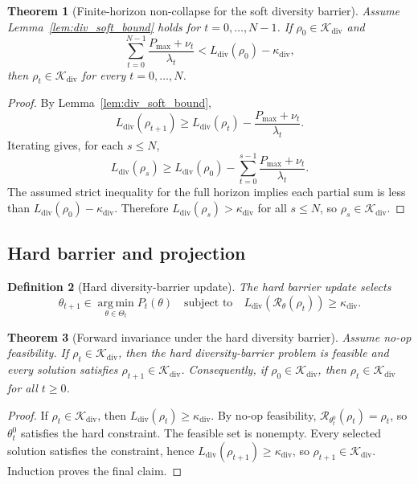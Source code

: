 \documentclass[11pt]{article}
\newtheorem{theorem}{Theorem}[section]
\newtheorem{definition}[theorem]{Definition}
\newcommand{\K}{\mathcal{K}}
\newcommand{\Rcal}{\mathcal{R}}
\newcommand{\argmin}{\operatorname*{arg\,min}}
\newcommand{\1}{\mathbf{1}}
\newcommand{\diver}{\mathrm{div}}
\begin{document}
\begin{theorem}[Finite-horizon non-collapse for the soft diversity barrier]
\label{thm:div_finite_horizon}
Assume Lemma~\ref{lem:div_soft_bound} holds for \(t=0,\dots,N-1\). If \(\rho_0\in\K_{\diver}\) and
\[
\sum_{t=0}^{N-1}\frac{P_{\max}+\nu_t}{\lambda_t}
<
L_{\diver}(\rho_0)-\kappa_{\diver},
\]
then \(\rho_t\in\K_{\diver}\) for every \(t=0,\dots,N\).
\end{theorem}

\begin{proof}
By Lemma~\ref{lem:div_soft_bound},
\[
L_{\diver}(\rho_{t+1})
\ge
L_{\diver}(\rho_t)-\frac{P_{\max}+\nu_t}{\lambda_t}.
\]
Iterating gives, for each \(s\le N\),
\[
L_{\diver}(\rho_s)
\ge
L_{\diver}(\rho_0)-\sum_{t=0}^{s-1}\frac{P_{\max}+\nu_t}{\lambda_t}.
\]
The assumed strict inequality for the full horizon implies each partial sum is less than \(L_{\diver}(\rho_0)-\kappa_{\diver}\). Therefore \(L_{\diver}(\rho_s)>\kappa_{\diver}\) for all \(s\le N\), so \(\rho_s\in\K_{\diver}\).
\end{proof}

\subsection{Hard barrier and projection}

\begin{definition}[Hard diversity-barrier update]
The hard barrier update selects
\[
\theta_{t+1}
\in
\argmin_{\theta\in\Theta_t} P_t(\theta)
\quad\text{subject to}\quad
L_{\diver}(\Rcal_\theta(\rho_t))\ge\kappa_{\diver}.
\]
\end{definition}

\begin{theorem}[Forward invariance under the hard diversity barrier]
\label{thm:div_hard_invariance}
Assume no-op feasibility. If \(\rho_t\in\K_{\diver}\), then the hard diversity-barrier problem is feasible and every solution satisfies \(\rho_{t+1}\in\K_{\diver}\). Consequently, if \(\rho_0\in\K_{\diver}\), then \(\rho_t\in\K_{\diver}\) for all \(t\ge0\).
\end{theorem}

\begin{proof}
If \(\rho_t\in\K_{\diver}\), then \(L_{\diver}(\rho_t)\ge\kappa_{\diver}\). By no-op feasibility, \(\Rcal_{\theta_t^0}(\rho_t)=\rho_t\), so \(\theta_t^0\) satisfies the hard constraint. The feasible set is nonempty. Every selected solution satisfies the constraint, hence \(L_{\diver}(\rho_{t+1})\ge\kappa_{\diver}\), so \(\rho_{t+1}\in\K_{\diver}\). Induction proves the final claim.
\end{proof}
\end{document}
